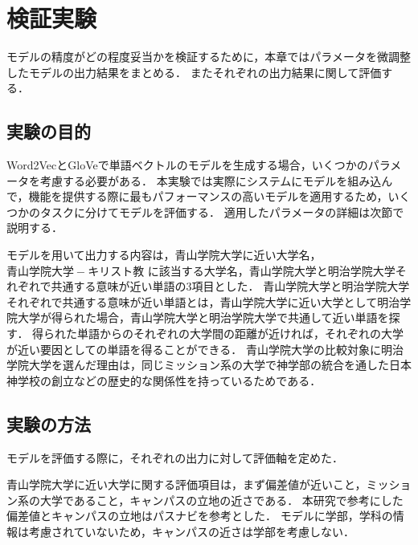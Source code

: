 \chapter{検証実験}
モデルの精度がどの程度妥当かを検証するために，本章ではパラメータを微調整したモデルの出力結果をまとめる．
またそれぞれの出力結果に関して評価する．

\section{実験の目的}
Word2VecとGloVeで単語ベクトルのモデルを生成する場合，いくつかのパラメータを考慮する必要がある．
本実験では実際にシステムにモデルを組み込んで，機能を提供する際に最もパフォーマンスの高いモデルを適用するため，いくつかのタスクに分けてモデルを評価する．
適用したパラメータの詳細は次節で説明する．


モデルを用いて出力する内容は，青山学院大学に近い大学名， $ 青山学院大学 - キリスト教 $ に該当する大学名，青山学院大学と明治学院大学それぞれで共通する意味が近い単語の3項目とした．
青山学院大学と明治学院大学それぞれで共通する意味が近い単語とは，青山学院大学に近い大学として明治学院大学が得られた場合，青山学院大学と明治学院大学で共通して近い単語を探す．
得られた単語からのそれぞれの大学間の距離が近ければ，それぞれの大学が近い要因としての単語を得ることができる．
青山学院大学の比較対象に明治学院大学を選んだ理由は，同じミッション系の大学で神学部の統合を通した日本神学校の創立などの歴史的な関係性を持っているためである．

\section{実験の方法}
モデルを評価する際に，それぞれの出力に対して評価軸を定めた．

青山学院大学に近い大学に関する評価項目は，まず偏差値が近いこと，ミッション系の大学であること，キャンパスの立地の近さである．
本研究で参考にした偏差値とキャンパスの立地はパスナビ\cite{passNavi}を参考とした．
モデルに学部，学科の情報は考慮されていないため，キャンパスの近さは学部を考慮しない．

